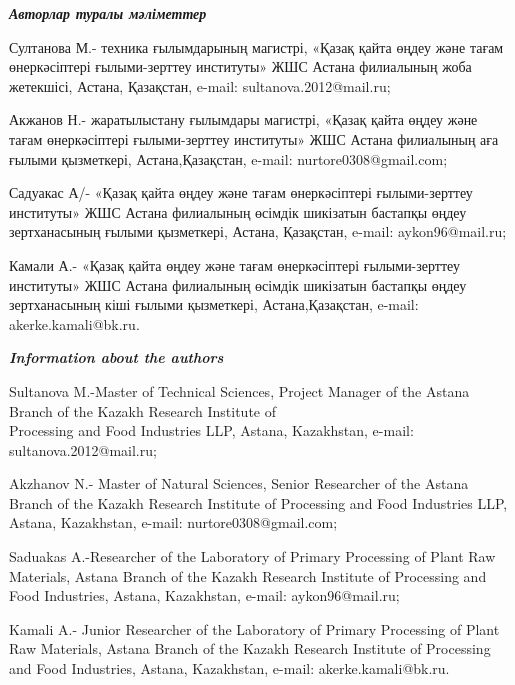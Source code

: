 \begin{authorinfo}
\emph{{\bfseries Авторлар туралы мәліметтер}}

Султанова М.- техника ғылымдарының магистрі, «Қазақ қайта өңдеу және
тағам өнеркәсіптері ғылыми-зерттеу институты» ЖШС Астана филиалының жоба
жетекшісі, Астана, Қазақстан, e-mail: sultanova.2012@mail.ru;

Акжанов Н.- жаратылыстану ғылымдары магистрі, «Қазақ қайта өңдеу және
тағам өнеркәсіптері ғылыми-зерттеу институты» ЖШС Астана филиалының аға
ғылыми қызметкері, Астана,Қазақстан, e-mail: nurtore0308@gmail.com;

Садуакас А/- «Қазақ қайта өңдеу және тағам өнеркәсіптері ғылыми-зерттеу
институты» ЖШС Астана филиалының өсімдік шикізатын бастапқы өңдеу
зертханасының ғылыми қызметкері, Астана, Қазақстан, e-mail:
aykon96@mail.ru;

Камали А.- «Қазақ қайта өңдеу және тағам өнеркәсіптері ғылыми-зерттеу
институты» ЖШС Астана филиалының өсімдік шикізатын бастапқы өңдеу
зертханасының кіші ғылыми қызметкері, Астана,Қазақстан, e-mail:
akerke.kamali@bk.ru.

\emph{{\bfseries Information about the authors}}

Sultanova M.-Master of Technical Sciences, Project Manager of the Astana
Branch of the Kazakh Research Institute of \\Processing and Food
Industries LLP, Astana, Kazakhstan, e-mail: sultanova.2012@mail.ru;

Akzhanov N.- Master of Natural Sciences, Senior Researcher of the Astana
Branch of the Kazakh Research Institute of Processing and Food
Industries LLP, Astana, Kazakhstan, e-mail: nurtore0308@gmail.com;

Saduakas A.-Researcher of the Laboratory of Primary Processing of Plant
Raw Materials, Astana Branch of the Kazakh Research Institute of
Processing and Food Industries, Astana, Kazakhstan, e-mail:
aykon96@mail.ru;

Kamali A.- Junior Researcher of the Laboratory of Primary Processing of
Plant Raw Materials, Astana Branch of the Kazakh Research Institute of
Processing and Food Industries, Astana, Kazakhstan, e-mail:
akerke.kamali@bk.ru.
\end{authorinfo}
